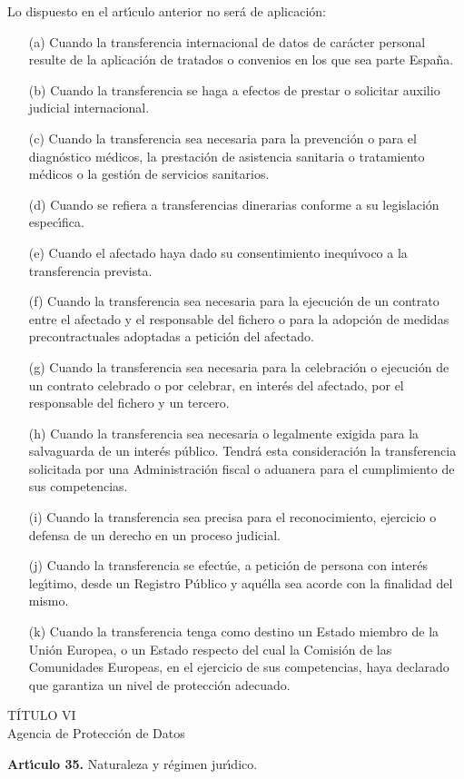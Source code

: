 Lo dispuesto en el art\'{\i}culo anterior no ser\'a de aplicaci\'on:
\begin{itemize}
\item[(a)] Cuando la transferencia internacional de datos de car\'acter 
personal resulte de la aplicaci\'on de tratados o convenios en los que sea 
parte Espa\~na.
\item [(b)] Cuando la transferencia se haga a efectos de prestar o solicitar 
auxilio judicial internacional.
\item [(c)] Cuando la transferencia sea necesaria para la prevenci\'on o para 
el diagn\'ostico m\'edicos, la prestaci\'on de asistencia sanitaria o 
tratamiento m\'edicos o la gesti\'on de servicios sanitarios.
\item [(d)] Cuando se refiera a transferencias dinerarias conforme a su 
legislaci\'on espec\'{\i}fica.
\item [(e)] Cuando el afectado haya dado su consentimiento inequ\'{\i}voco a la 
transferencia prevista.
\item [(f)] Cuando la transferencia sea necesaria para la ejecuci\'on de un 
contrato entre el afectado y el responsable del fichero o para la adopci\'on de 
medidas precontractuales adoptadas a petici\'on del afectado.
\item [(g)] Cuando la transferencia sea necesaria para la celebraci\'on o 
ejecuci\'on de un contrato celebrado o por celebrar, en inter\'es del afectado,
por el responsable del fichero y un tercero.
\item [(h)] Cuando la transferencia sea necesaria o legalmente exigida para la 
salvaguarda de un inter\'es p\'ublico. Tendr\'a esta consideraci\'on la 
transferencia solicitada por una Administraci\'on fiscal o aduanera para el 
cumplimiento de sus competencias.
\item [(i)] Cuando la transferencia sea precisa para el reconocimiento, 
ejercicio o defensa de un derecho en un proceso judicial.
\item [(j)] Cuando la transferencia se efect\'ue, a petici\'on de persona con 
inter\'es leg\'{\i}timo, desde un Registro P\'ublico y aqu\'ella sea acorde con 
la finalidad del mismo.
\item [(k)] Cuando la transferencia tenga como destino un Estado miembro de la 
Uni\'on Europea, o un Estado respecto del cual la Comisi\'on de las Comunidades 
Europeas, en el ejercicio de sus competencias, haya declarado que garantiza un 
nivel de protecci\'on adecuado.
\end{itemize}
\begin{center}
{\LARGE T\'ITULO VI}\\
{\large Agencia de Protecci\'on de Datos}
\end{center}
\vspace{0.3cm}
{\large {\bf Art\'{\i}culo 35.} Naturaleza y r\'egimen jur\'{\i}dico.}

